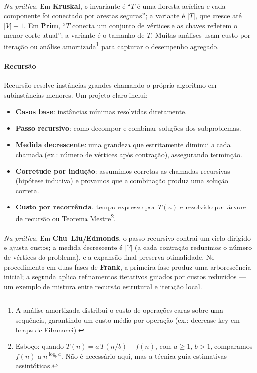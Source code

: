 \documentclass[12pt,a4paper]{article}
\def\texttt#1{#1}%
\def\emph#1{#1}%
\begin{document}
\paragraph{}
	\textit{Na prática.} Em \textbf{Kruskal}, o invariante é “$T$ é uma floresta acíclica e cada componente foi conectado por arestas seguras”; a variante é $|T|$, que cresce até $|V|-1$. Em \textbf{Prim}, “$T$ conecta um conjunto de vértices e as chaves refletem o menor corte atual”; a variante é o tamanho de $T$. Muitas análises usam \emph{custo por iteração} ou \emph{análise amortizada}\footnote{A análise amortizada distribui o custo de operações caras sobre uma sequência, garantindo um custo médio por operação (ex.: \texttt{decrease-key} em heaps de Fibonacci).} para capturar o desempenho agregado.

\paragraph{Recursão}
\paragraph{}
Recursão resolve instâncias grandes chamando o próprio algoritmo em subinstâncias menores. Um projeto claro inclui:

\begin{itemize}\setlength{\itemsep}{2pt}
    \item \textbf{Casos base}: instâncias mínimas resolvidas diretamente.
    \item \textbf{Passo recursivo}: como decompor e combinar soluções dos subproblemas.
    \item \textbf{Medida decrescente}: uma grandeza que estritamente diminui a cada chamada (ex.: número de vértices após contração), assegurando terminção.
    \item \textbf{Corretude por indução}: assumimos corretas as chamadas recursivas (hipótese indutiva) e provamos que a combinação produz uma solução correta.
    \item \textbf{Custo por recorrência}: tempo expresso por $T(n)$ e resolvido por \emph{árvore de recursão} ou Teorema Mestre\footnote{Esboço: quando $T(n)=a\,T(n/b)+f(n)$, com $a\ge 1$, $b>1$, comparamos $f(n)$ a $n^{\log_b a}$. Não é necessário aqui, mas a técnica guia estimativas assintóticas.}.
\end{itemize}

\paragraph{}
	\textit{Na prática.} Em \textbf{Chu–Liu/Edmonds}, o passo recursivo contrai um ciclo dirigido e ajusta custos; a medida decrescente é $|V|$ (a cada contração reduzimos o número de vértices do problema), e a expansão final preserva otimalidade. No procedimento em duas fases de \textbf{Frank}, a primeira fase produz uma arborescência inicial; a segunda aplica \emph{refinamentos iterativos} guiados por custos reduzidos — um exemplo de mistura entre recursão estrutural e iteração local.
\end{document}
